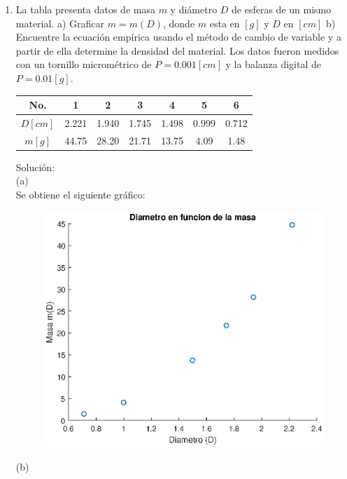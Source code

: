 \documentclass[letter,11pt]{article}
\begin{document}
\begin{enumerate}
\newpage
\item La tabla presenta datos de masa $m$ y diámetro $D$ de esferas de un mismo
    material. a) Graficar $m = m(D)$, donde $m$ esta en $[g]$ y $D$ en $[cm]$
    b) Encuentre la ecuación empírica usando el método de cambio de variable y
    a partir de ella determine la densidad del material. Los datos fueron
    medidos con un tornillo micrométrico de $P = 0.001[cm]$ y la balanza digital
    de $P = 0.01[g]$.

    \begin{center}
    \begin{tabular}{|c|c|c|c|c|c|c|}
    \hline
    No. & 1 & 2 & 3 & 4 & 5 & 6 \tabularnewline \hline
    $D[cm]$ & 2.221 & 1.940 & 1.745 & 1.498 & 0.999 & 0.712 \tabularnewline \hline
    $m[g]$ & 44.75 & 28.20 & 21.71 & 13.75 & 4.09 & 1.48 \tabularnewline \hline
    \end{tabular}
    \end{center}

    Solución: \\
    (a) \\

    Se obtiene el siguiente gráfico:

    \begin{figure}[!h]
    \centering
    \includegraphics[scale=0.75]{resources/g4a.eps}
    \end{figure}

    (b) \\


\end{enumerate}
\end{document}
